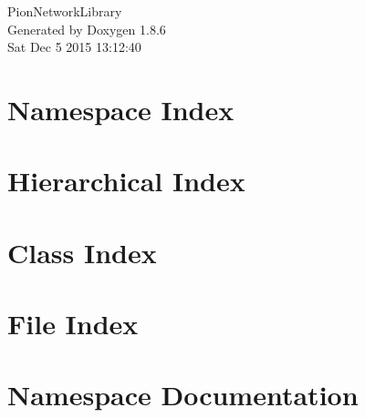 \documentclass[twoside]{book}
\newcommand{\clearemptydoublepage}{%
  \newpage{\pagestyle{empty}\cleardoublepage}%
}
\begin{document}
\hypersetup{pageanchor=false}
\begin{titlepage}
\vspace*{7cm}
\begin{center}%
{\Large Pion\-Network\-Library }\\
\vspace*{1cm}
{\large Generated by Doxygen 1.8.6}\\
\vspace*{0.5cm}
{\small Sat Dec 5 2015 13:12:40}\\
\end{center}
\end{titlepage}
\clearemptydoublepage
\tableofcontents
\clearemptydoublepage
{}
\hypersetup{pageanchor=true}

\chapter{Namespace Index}

\chapter{Hierarchical Index}

\chapter{Class Index}

\chapter{File Index}

\chapter{Namespace Documentation}















\end{document}
